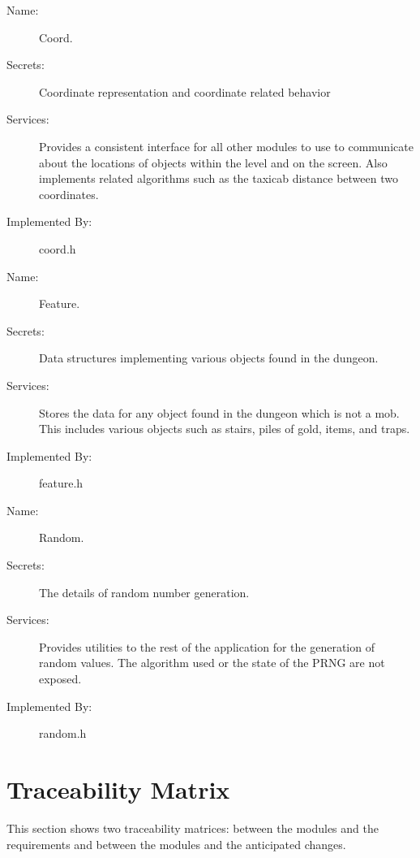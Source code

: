 \documentclass[12pt, titlepage]{article}
\newcommand{\newSection}[1]{
  \newpage
  \section{#1}
}
\begin{document}
        \bigskip\begin{description}
            \item[Name:]Coord.
            \item[Secrets:]Coordinate representation and coordinate related behavior
            \item[Services:]Provides a consistent interface for all other modules to use to communicate about the locations of objects within the level and on the screen. Also implements related algorithms such as the taxicab distance between two coordinates.
            \item[Implemented By:]coord.h
        \end{description}

        \bigskip\begin{description}
            \item[Name:]Feature.
            \item[Secrets:]Data structures implementing various objects found in the dungeon.
            \item[Services:]Stores the data for any object found in the dungeon which is not a mob. This includes various objects such as stairs, piles of gold, items, and traps.
            \item[Implemented By:]feature.h
        \end{description}

            \bigskip\begin{description}
            \item[Name:]Random.
            \item[Secrets:]The details of random number generation.
            \item[Services:]Provides utilities to the rest of the application for the generation of random
            values. The algorithm used or the state of the PRNG are not exposed.
            \item[Implemented By:] random.h
        \end{description}

\newSection{Traceability Matrix} \label{SecTM}

    This section shows two traceability matrices: between the modules and the
    requirements and between the modules and the anticipated changes.
\end{document}
